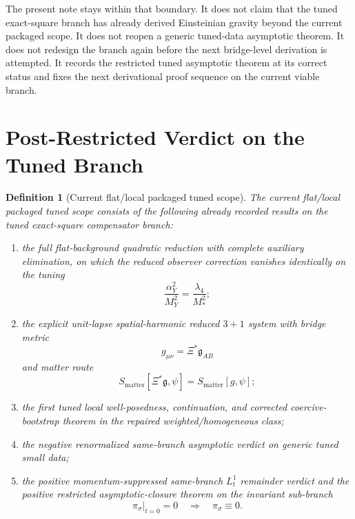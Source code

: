 \documentclass[11pt]{article}
\newcommand{\BridgeMetric}{\mathfrak{g}}
\newtheorem{definition}{Definition}
\begin{document}
The present note stays within that boundary. It does not claim that the tuned exact-square branch has already derived Einsteinian gravity beyond the current packaged scope. It does not reopen a generic tuned-data asymptotic theorem. It does not redesign the branch again before the next bridge-level derivation is attempted. It records the restricted tuned asymptotic theorem at its correct status and fixes the next derivational proof sequence on the current viable branch.

\section{Post-Restricted Verdict on the Tuned Branch}

\begin{definition}[Current flat/local packaged tuned scope]
\label{def:packaged}
The \emph{current flat/local packaged tuned scope} consists of the following already recorded results on the tuned exact-square compensator branch:
\begin{enumerate}
    \item the full flat-background quadratic reduction with complete auxiliary elimination, on which the reduced observer correction vanishes identically on the tuning
    \begin{equation}
    \frac{\alpha_Y^2}{M_Y^2}=\frac{\lambda_4}{M_*^2};
    \label{eq:tuning}
    \end{equation}
    \item the explicit unit-lapse spatial-harmonic reduced \(3+1\) system with bridge metric
    \begin{equation}
    g_{\mu\nu}=\Xi^\ast\BridgeMetric_{AB}
    \label{eq:obsmetric}
    \end{equation}
    and matter route
    \begin{equation}
    S_{\mathrm{matter}}[\Xi^\ast\BridgeMetric,\psi]
    =
    S_{\mathrm{matter}}[g,\psi];
    \label{eq:matterroute}
    \end{equation}
    \item the first tuned local well-posedness, continuation, and corrected coercive-bootstrap theorem in the repaired weighted/homogeneous class;
    \item the negative renormalized same-branch asymptotic verdict on generic tuned small data;
    \item the positive momentum-suppressed same-branch \(L_t^1\) remainder verdict and the positive restricted asymptotic-closure theorem on the invariant sub-branch
    \begin{equation}
    \pi_\sigma|_{t=0}=0
    \quad\Longrightarrow\quad
    \pi_\sigma\equiv 0.
    \label{eq:restrictedbranch}
    \end{equation}
\end{enumerate}
\end{definition}
\end{document}
